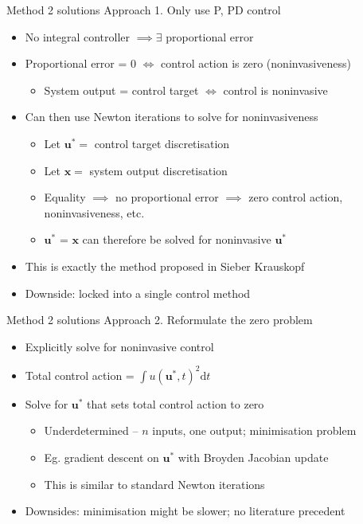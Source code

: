 \documentclass[presentation]{beamer}
\begin{document}
\begin{frame}[<+->][label={sec:org0c73add}]{Method 2 solutions}
Approach 1. Only use P, PD control
\begin{itemize}
\item No integral controller \(\implies\exists\) proportional error
\item Proportional error = 0 \(\iff\) control action is zero (noninvasiveness)
\begin{itemize}
\item System output = control target \(\iff\) control is noninvasive
\end{itemize}
\item Can then use Newton iterations to solve for noninvasiveness
\begin{itemize}
\item Let \(\mathbf{u}^*=\) control target discretisation
\item Let \(\mathbf{x}=\) system output discretisation
\item Equality \(\implies\) no proportional error \(\implies\) zero control action, noninvasiveness, etc.
\item \(\mathbf{u}^*\) = \(\mathbf{x}\) can therefore be solved for noninvasive \(\mathbf{u}^*\)
\end{itemize}
\item This is exactly the method proposed in Sieber Krauskopf
\item Downside: locked into a single control method
\end{itemize}
\end{frame}

\begin{frame}[<+->][label={sec:orga27eca3}]{Method 2 solutions}
Approach 2. Reformulate the zero problem
\vfill
\begin{itemize}
\item Explicitly solve for noninvasive control
\item Total control action = \(\int u(\mathbf{u^*}, t)^2\mathrm{d}t\)
\item Solve for \(\mathbf{u}^*\) that sets total control action to zero
\begin{itemize}
\item Underdetermined -- \(n\) inputs, one output; minimisation problem
\item Eg. gradient descent on \(\mathbf{u}^*\) with Broyden Jacobian update
\item This is similar to standard Newton iterations
\end{itemize}
\item Downsides: minimisation might be slower; no literature precedent
\end{itemize}
\end{frame}
\end{document}

